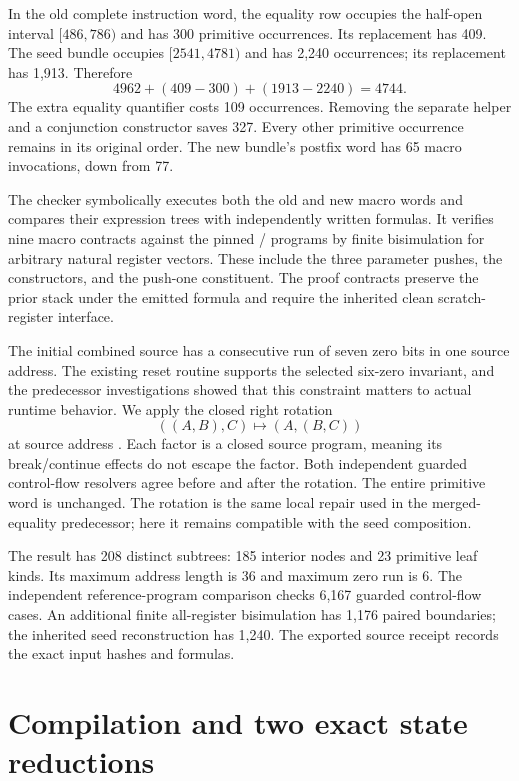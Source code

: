 In the old complete instruction word, the equality row occupies the
half-open interval $[486,786)$ and has 300 primitive occurrences. Its
replacement has 409. The seed bundle occupies $[2541,4781)$ and has
2,240 occurrences; its replacement has 1,913. Therefore
\[
                  4962+(409-300)+(1913-2240)=4744.
\]
The extra equality quantifier costs 109 occurrences. Removing the
separate helper and a conjunction constructor saves 327. Every other
primitive occurrence remains in its original order. The new bundle's
postfix word has 65 macro invocations, down from 77.

The checker symbolically executes both the old and new macro words and
compares their expression trees with independently written formulas.
It verifies nine macro contracts against the pinned
/ programs by finite bisimulation for
arbitrary natural register vectors. These include the three parameter
pushes, the constructors, and the push-one constituent. The proof
contracts preserve the prior stack under the emitted formula and require
the inherited clean scratch-register interface.

The initial combined source has a consecutive run of seven zero bits in
one source address. The existing reset routine supports the selected
six-zero invariant, and the predecessor investigations showed that this
constraint matters to actual runtime behavior. We apply the closed right
rotation
\[
                  ((A,B),C)\longmapsto (A,(B,C))
\]
at source address . Each factor is a closed
source program, meaning its break/continue effects do not escape the
factor. Both independent guarded control-flow resolvers agree before
and after the rotation. The entire primitive word is unchanged. The
rotation is the same local repair used in the merged-equality predecessor;
here it remains compatible with the seed composition.

The result has 208 distinct subtrees: 185 interior nodes and 23 primitive
leaf kinds. Its maximum address length is 36 and maximum zero run is 6.
The independent reference-program comparison checks 6,167 guarded
control-flow cases. An additional finite all-register bisimulation has
1,176 paired boundaries; the inherited seed reconstruction has 1,240.
The exported source receipt records the exact input hashes and formulas.

\section{Compilation and two exact state reductions}
\label{sec:folds}

